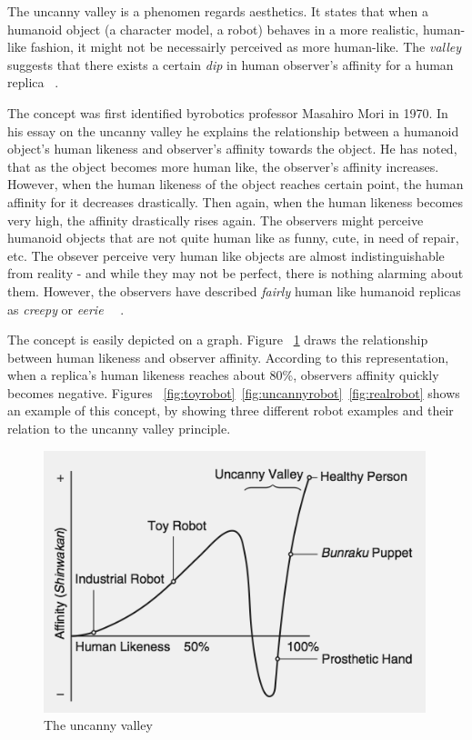 The uncanny valley is a phenomen regards aesthetics. It states that when a humanoid object (a character model, a robot) behaves in a more realistic, human-like fashion, it might not be necessairly perceived as more human-like. The \textit{valley} suggests that there exists a certain \textit{dip} in human observer's affinity for a human replica ~\cite{uncanny1}.

The concept was first identified byrobotics professor Masahiro Mori in 1970. In his essay on the uncanny valley he explains the relationship between a humanoid object's human likeness and observer's affinity towards the object. He has noted, that as the object becomes more human like, the observer's affinity increases. However, when the human likeness of the object reaches certain point, the human affinity for it decreases drastically. Then again, when the human likeness becomes very high, the affinity drastically rises again. The observers might perceive humanoid objects that are not quite human like as funny, cute, in need of repair, etc. The obsever perceive very human like objects are almost indistinguishable from reality - and while they may not be perfect, there is nothing alarming about them. However, the observers have described \textit{fairly} human like humanoid replicas as \textit{creepy} or \textit{eerie} ~\cite{uncanny1}~\cite{uncanny2}.

The concept is easily depicted on a graph. Figure ~\ref{fig:uncanny} draws the relationship between human likeness and observer affinity. According to this representation, when a replica's human likeness reaches about 80\%, observers affinity quickly becomes negative. Figures ~\ref{fig:toyrobot}~\ref{fig:uncannyrobot}~\ref{fig:realrobot} shows an example of this concept, by showing three different robot examples and their relation to the uncanny valley principle. 

\begin{figure}[!ht]
\centerline{\includegraphics[width = 30em,scale=0.25]{img/uncanny.png}}
\caption{The uncanny valley}\label{fig:uncanny}
\end{figure}

